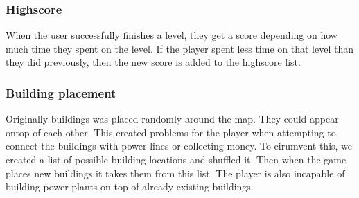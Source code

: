 	\subsubsection*{Highscore}

	When the user successfully finishes a level, they get a score depending on
	how much time they spent on the level. If the player spent less time on that
	level than they did previously, then the new score is added to the highscore
	list.

	\subsubsection*{Building placement}

	Originally buildings was placed randomly around the map. They could appear
	ontop of each other. This created problems for the player when attempting to
	connect the buildings with power lines or collecting money. To cirumvent
	this, we created a list of possible building locations and shuffled it. Then
	when the game places new buildings it takes them from this list. The player
	is also incapable of building power plants on top of already existing
	buildings.
	
